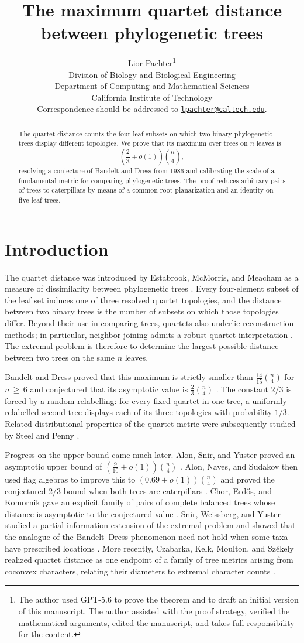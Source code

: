 \documentclass[11pt]{article}
\title{The maximum quartet distance between phylogenetic trees}
\author{Lior Pachter\thanks{The author used GPT-5.6 to prove the theorem and
to draft an initial version of this manuscript.  The author assisted with the
proof strategy, verified the mathematical arguments, edited the manuscript,
and takes full responsibility for the content.}\\
Division of Biology and Biological Engineering\\
Department of Computing and Mathematical Sciences\\
California Institute of Technology\\
Correspondence should be addressed to
\href{mailto:lpachter@caltech.edu}{\texttt{lpachter@caltech.edu}}.}
\date{}
\theoremstyle{definition}
\begin{document}
\maketitle

\begin{abstract}
The quartet distance counts the four-leaf subsets on which two binary
phylogenetic trees display different topologies.  We prove that its maximum
over trees on $n$ leaves is
\[
 \left(\frac23+o(1)\right)\binom n4,
\]
resolving a conjecture of Bandelt and Dress from 1986 and calibrating the
scale of a fundamental metric for comparing phylogenetic trees.  The proof
reduces arbitrary pairs of trees to caterpillars by means of a common-root
planarization and an identity on five-leaf trees.
\end{abstract}

\section{Introduction}

The quartet distance was introduced by Estabrook, McMorris, and Meacham
as a measure of dissimilarity between phylogenetic trees
\cite{Estabrook_1985}.  Every four-element subset of the leaf set induces
one of three resolved quartet topologies, and the distance between two
binary trees is the number of subsets on which those topologies differ.
Beyond their use in comparing trees, quartets also underlie reconstruction
methods; in particular, neighbor joining admits a robust quartet
interpretation \cite{Mihaescu_2009}.
The extremal problem is therefore to determine the largest possible
distance between two trees on the same $n$ leaves.

Bandelt and Dress proved that this maximum is strictly smaller than
$\frac{14}{15}\binom n4$ for $n\,\geq\,6$ and conjectured that its asymptotic
value is $\frac23\binom n4$ \cite{Bandelt_1986}.  The constant $2/3$ is
forced by a random relabelling: for every fixed quartet in one tree, a
uniformly relabelled second tree displays each of its three topologies
with probability $1/3$.  Related distributional properties of the
quartet metric were subsequently studied by Steel and Penny
\cite{Steel_1993}.

Progress on the upper bound came much later.  Alon, Snir, and Yuster
proved an asymptotic upper bound of
$\left(\frac9{10}+o(1)\right)\binom n4$
\cite{Alon_2014}.  Alon, Naves, and Sudakov then used flag algebras
\cite{Razborov_2007} to improve this to
$\left(0.69+o(1)\right)\binom n4$ and proved the conjectured $2/3$ bound
when both trees are caterpillars \cite{Alon_2016}.  Chor, Erd\H{o}s, and Komornik
gave an explicit family of pairs of complete balanced trees whose
distance is asymptotic to the conjectured value \cite{Chor_2019}.
Snir, Weissberg, and Yuster studied a partial-information extension of
the extremal problem and showed that the analogue of the Bandelt--Dress
phenomenon need not hold when some taxa have prescribed locations
\cite{Snir_2021}.  More recently, Czabarka, Kelk, Moulton, and Sz\'ekely
realized quartet distance as one endpoint of a family of tree metrics
arising from coconvex characters, relating their diameters to extremal
character counts \cite{Czabarka_2026}.
\end{document}
